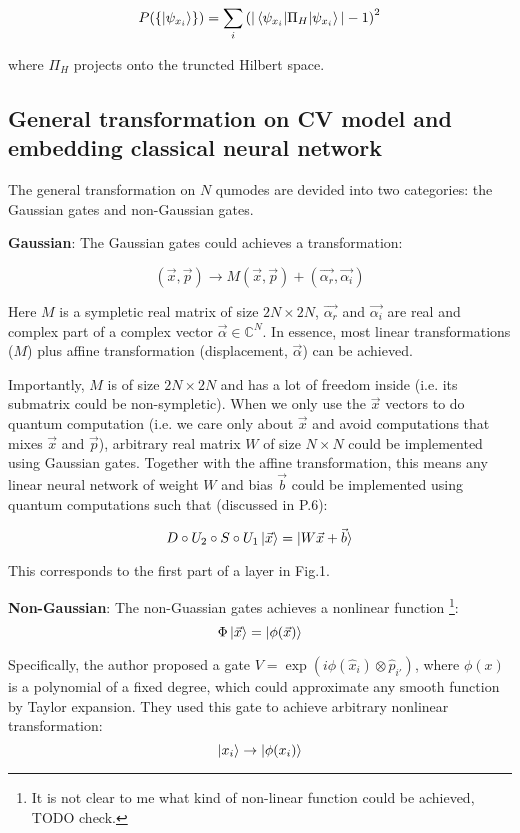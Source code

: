 \documentclass{article}
\begin{document}
$$
P(\{\ket{\psi_{x_i}}\}) = 
\sum_i \left( |\braket{\psi_{x_i} | \Pi_H | \psi_{x_i}}| - 1\right)^2
$$

where $\Pi_H$ projects onto the truncted Hilbert space.

\subsection{ General transformation on CV model and embedding classical neural
network}

The general transformation on $N$ qumodes are devided into two categories: the Gaussian gates and non-Gaussian gates. 

\textbf{ Gaussian}:
The Gaussian gates could achieves a transformation:

$$ 
(\vec{x}, \vec{p}) \to M (\vec{x}, \vec{p}) + (\vec{\alpha_r}, \vec{\alpha_i})
$$

Here $M$ is a sympletic real matrix of size $2N\times 2N$, $\vec{\alpha_r}$
and $\vec{\alpha_i}$ are real and complex part of a complex vector
$\vec{\alpha}\in \mathbb{C}^{N}$. In essence, most linear transformations
($M$) plus affine transformation (displacement, $\vec{\alpha}$) can be
achieved.

Importantly, $M$ is of size $2N\times 2N$ and has a lot of freedom inside (i.e. its submatrix could be non-sympletic). When we only use the $\vec{x}$ vectors to do quantum computation (i.e. we care only about $\vec{x}$ and avoid computations that mixes $\vec{x}$ and $\vec{p}$), arbitrary real matrix $W$ of size $N\times N$ could be implemented using Gaussian gates. Together with the affine transformation, this means any linear neural network of weight $W$ and bias $\vec{b}$ could be implemented using quantum computations such that (discussed in P.6):

$$
D\circ U_2 \circ S \circ U_1 \ket{\vec{x}} = \ket{W\vec{x} + \vec{b}}
$$

This corresponds to the first part of a layer in Fig.1.

\textbf{Non-Gaussian}: The non-Guassian gates achieves a nonlinear function
\footnote{It is not clear to me what kind of non-linear function could be achieved, TODO check.}:
$$
\Phi \ket{\vec{x}} = \ket{\phi(\vec{x})}
$$

Specifically, the author proposed a gate $V = \exp(i \phi(\hat{x}_i)\otimes \hat{p}_{i'})$, where $\phi(x)$ is a polynomial of a fixed degree, which could approximate any smooth function by Taylor expansion. They used this gate to achieve arbitrary nonlinear transformation:
$$
\ket{x_i} \to \ket{\phi(x_i)}
$$
\end{document}
